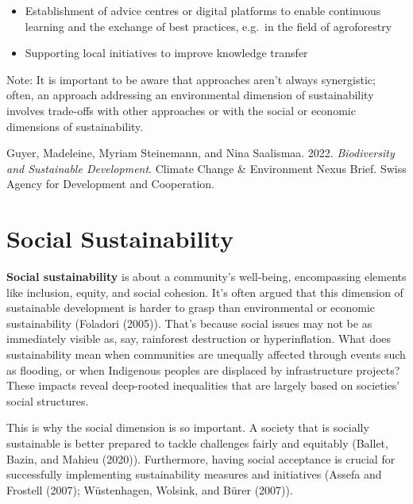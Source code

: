 \documentclass[
  a4paper,
  openany]{book}
\begin{document}
\begin{itemize}
\item
  Establishment of advice centres or digital platforms to enable
  continuous learning and the exchange of best practices, e.g.~in the
  field of agroforestry
\item
  Supporting local initiatives to improve knowledge transfer\\
\end{itemize}

Note: It is important to be aware that approaches aren't always
synergistic; often, an approach addressing an environmental dimension of
sustainability involves trade-offs with other approaches or with the
social or economic dimensions of sustainability.

\begin{tcolorbox}[enhanced jigsaw, coltitle=black, bottomtitle=1mm, opacitybacktitle=0.6, titlerule=0mm, opacityback=0, leftrule=.75mm, colbacktitle=quarto-callout-note-color!10!white, bottomrule=.15mm, toptitle=1mm, breakable, title={Further reading}, arc=.35mm, rightrule=.15mm, toprule=.15mm, left=2mm, colback=white, colframe=quarto-callout-note-color-frame]

Guyer, Madeleine, Myriam Steinemann, and Nina Saalismaa. 2022.
\emph{Biodiversity and Sustainable Development}. Climate Change \&
Environment Nexus Brief. Swiss Agency for Development and Cooperation.

\end{tcolorbox}

\chapter{Social Sustainability}\label{social-sustainability}

\textbf{Social sustainability} is about a community's well-being,
encompassing elements like inclusion, equity, and social cohesion. It's
often argued that this dimension of sustainable development is harder to
grasp than environmental or economic sustainability (Foladori (2005)).
That's because social issues may not be as immediately visible as, say,
rainforest destruction or hyperinflation. What does sustainability mean
when communities are unequally affected through events such as flooding,
or when Indigenous peoples are displaced by infrastructure projects?
These impacts reveal deep-rooted inequalities that are largely based on
societies' social structures.

This is why the social dimension is so important. A society that is
socially sustainable is better prepared to tackle challenges fairly and
equitably (Ballet, Bazin, and Mahieu (2020)). Furthermore, having social
acceptance is crucial for successfully implementing sustainability
measures and initiatives (Assefa and Frostell (2007); Wüstenhagen,
Wolsink, and Bürer (2007)).
\end{document}
